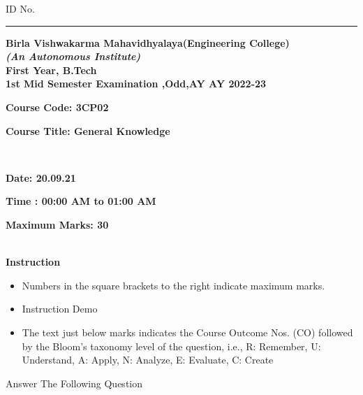\documentclass[addpoints,12pt]{exam}
\begin{document}
  
  \hspace{-7mm}ID No.\rule{20mm}{0.3mm}
  
  \begin{center} 
  
  \textbf{Birla Vishwakarma Mahavidhyalaya(Engineering College)} \\
  \textbf{\textit{(An Autonomous Institute)}} \\
  \textbf{First Year, B.Tech} \\
  \textbf{1st Mid Semester Examination ,Odd,AY AY 2022-23} \\
  \vspace{4mm}
  
  
  \end{center}
  
  \hspace{-7mm}
  \parbox[t]{50mm}{\textbf{Course Code: 3CP02}}
  \parbox[t]{100mm}{\textbf{Course Title: General Knowledge}}\vspace{2mm}\\
  \parbox[t]{50mm}{\textbf{Date: 20.09.21}}
  \parbox[t]{75mm}{\textbf{Time : 00:00 AM to 01:00 AM}}
  \parbox[t]{50mm}{\textbf{Maximum Marks: 30}}\\
  \hline \vspace{2mm} 
  \hspace{-6mm}\textbf{Instruction}

  
	
  \begin{itemize}[leftmargin=4mm,rightmargin=-2cm]
      \item Numbers in the square brackets to the right indicate maximum marks.
      \item Instruction Demo
      \item The text just below marks indicates the Course Outcome Nos. (CO) followed by the Bloom’s taxonomy level of the question, i.e., R: Remember, U: Understand, A: Apply, N: Analyze, E: Evaluate, C: Create
  \end{itemize}
  \hline
  \vspace{5mm}
  
  \begin{questions}
\pointname{}
\pointsinrightmargin
\pointformat{\parbox[t]{16pt}{\text{[\thepoints]}}}
\question[20]
\vspace{-\baselineskip}\vspace{1.5mm}Answer The Following Question

\end{questions}
\end{document}
